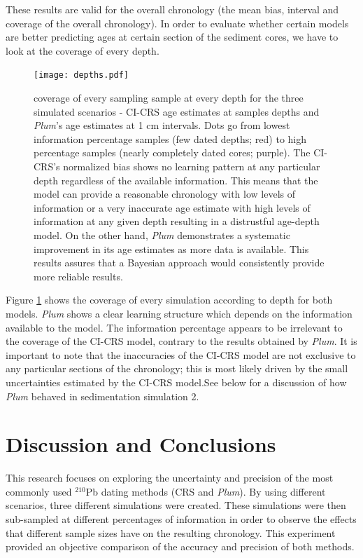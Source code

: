 \documentclass [10pt] {article}
\begin{document}
These results are valid for the overall chronology (the mean bias, interval and coverage of the overall chronology). 
In order to evaluate whether certain models are better predicting ages at certain section of the sediment cores, we have to look at the coverage of every depth. 


\begin{figure}[!]
	\begin{centering}
		\texttt{[image: depths.pdf]}
		\caption{coverage of every sampling sample at every depth for the three simulated scenarios - CI-CRS age estimates at samples depths and \textit{Plum}'s age estimates at 1 cm intervals. Dots go from lowest information percentage samples (few dated depths; red) to high percentage samples (nearly completely dated cores; purple). The CI-CRS's normalized bias shows no learning pattern at any particular depth regardless of the available information. This means that the model can provide a reasonable chronology with low levels of information or a very inaccurate age estimate with high levels of information at any given depth resulting in a distrustful age-depth model. On the other hand, \textit{Plum} demonstrates a systematic improvement in its age estimates as more data is available. This results assures that a Bayesian approach would consistently provide more reliable results.     }
		\label{fig:depths}
	\end{centering}
\end{figure}

Figure \ref{fig:depths} shows the coverage of every simulation according to depth for both models.
\textit{Plum} shows a clear learning structure which depends on the information available to the model.
The information percentage appears to be irrelevant to the coverage of the CI-CRS model, contrary to the results obtained by \textit{Plum}.
It is important to note that the inaccuracies of the CI-CRS model are not exclusive to any particular sections of the chronology; this is most likely driven by the small uncertainties estimated by the CI-CRS model.See below for a discussion of how \textit{Plum} behaved in sedimentation simulation 2.   



\section{Discussion and Conclusions}

This research focuses on exploring the uncertainty and precision of the most commonly used $^{210}$Pb dating methods (CRS and \textit{Plum}).
By using different scenarios, three different simulations were created.
These simulations were then sub-sampled at different percentages of information in order to observe the effects that different sample sizes have on the resulting chronology. 
This experiment provided an objective comparison of the accuracy and precision of both methods.
\end{document}
